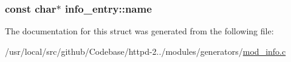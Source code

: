 \subsubsection[{\texorpdfstring{name}{name}}]{\setlength{\rightskip}{0pt plus 5cm}const char$\ast$ info\+\_\+entry\+::name}\hypertarget{structinfo__entry_a66d3f25172161a965052989c890fca0d}{}\label{structinfo__entry_a66d3f25172161a965052989c890fca0d}


The documentation for this struct was generated from the following file\+:\begin{DoxyCompactItemize}
\item 
/usr/local/src/github/\+Codebase/httpd-\/2../modules/generators/\hyperlink{mod__info_8c}{mod\+\_\+info.\+c}\end{DoxyCompactItemize}
